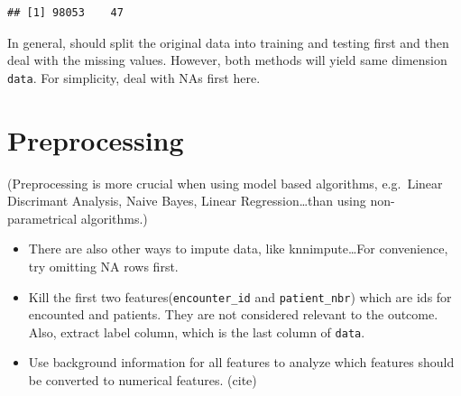 \documentclass[]{article}
\newenvironment{Shaded}{\begin{snugshade}}{\end{snugshade}}
\newcommand{\KeywordTok}[1]{\textcolor[rgb]{0.13,0.29,0.53}{\textbf{{#1}}}}
\newcommand{\DecValTok}[1]{\textcolor[rgb]{0.00,0.00,0.81}{{#1}}}
\newcommand{\StringTok}[1]{\textcolor[rgb]{0.31,0.60,0.02}{{#1}}}
\newcommand{\NormalTok}[1]{{#1}}
\begin{document}
\begin{verbatim}
## [1] 98053    47
\end{verbatim}

In general, should split the original data into training and testing
first and then deal with the missing values. However, both methods will
yield same dimension \texttt{data}. For simplicity, deal with NAs first
here.

\section{Preprocessing}\label{preprocessing}

(Preprocessing is more crucial when using model based algorithms,
e.g.~Linear Discrimant Analysis, Naive Bayes, Linear
Regression\ldots{}than using non-parametrical algorithms.)

\begin{itemize}
\item
  There are also other ways to impute data, like knnimpute\ldots{}For
  convenience, try omitting NA rows first.
\item
  Kill the first two features(\texttt{encounter\_id} and
  \texttt{patient\_nbr}) which are ids for encounted and patients. They
  are not considered relevant to the outcome. Also, extract label
  column, which is the last column of \texttt{data}.
\end{itemize}

\begin{Shaded}
\end{Shaded}

\begin{itemize}
\itemsep1pt\parskip0pt
\item
  Use background information for all features to analyze which features
  should be converted to numerical features. (cite)
\end{itemize}
\end{document}
